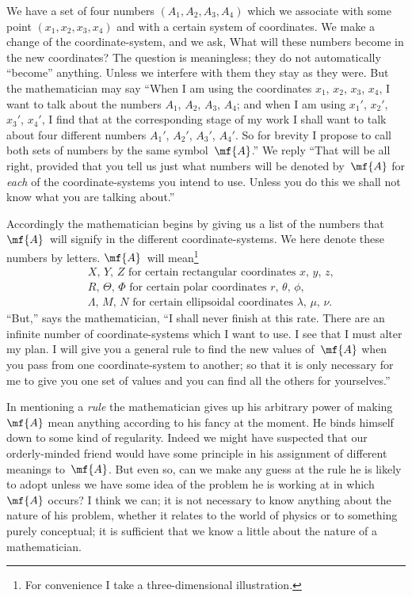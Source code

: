 \documentclass[12pt]{book}
\begin{document}
We have a set of four numbers $(A_{1}, A_{2}, A_{3}, A_{4})$ which we associate with
some point $(x_{1}, x_{2}, x_{3}, x_{4})$ and with a certain system of coordinates. We make
a change of the coordinate-system, and we ask, What will these numbers
become in the new coordinates? The question is meaningless; they do not
automatically ``become'' anything. Unless we interfere with them they stay
as they were. But the mathematician may say ``When I am using the
coordinates $x_{1}$, $x_{2}$, $x_{3}$, $x_{4}$, I want to talk about the numbers $A_{1}$, $A_{2}$, $A_{3}$, $A_{4}$;
and when I am using $x_{1}'$, $x_{2}'$, $x_{3}'$, $x_{4}'$, I find that at the corresponding stage of
my work I shall want to talk about four different numbers $A_{1}'$, $A_{2}'$, $A_{3}'$, $A_{4}'$.
So for brevity I propose to call both sets of numbers by the same symbol~$\mf{A}$.''
We reply ``That will be all right, provided that you tell us just what numbers
will be denoted by~$\mf{A}$ for \emph{each} of the coordinate-systems you intend to use.
Unless you do this we shall not know what you are talking about.''

Accordingly the mathematician begins by giving us a list of the numbers
that $\mf{A}$~will signify in the different coordinate-systems. We here denote these
numbers by letters. $\mf{A}$~will mean\footnote
  {For convenience I take a three-dimensional illustration.}
\begin{align*}
&\text{$X$, $Y$, $Z$ for certain rectangular coordinates $x$, $y$, $z$,} \\
&\text{$R$, $\Theta$, $\Phi$ for certain polar coordinates $r$, $\theta$, $\phi$,} \\
  &\text{$\Lambda$, $M$, $N$ for certain ellipsoidal coordinates $\lambda$, $\mu$, $\nu$.}
  \end{align*}
``But,'' says the mathematician, ``I shall never finish at this rate. There are
an infinite number of coordinate-systems which I want to use. I see that
I must alter my plan. I will give you a general rule to find the new values
of~$\mf{A}$ when you pass from one coordinate-system to another; so that it is only
necessary for me to give you one set of values and you can find all the others
for yourselves.''

In mentioning a \emph{rule} the mathematician gives up his arbitrary power of
making~$\mf{A}$ mean anything according to his fancy at the moment. He binds
himself down to some kind of regularity. Indeed we might have suspected
that our orderly-minded friend would have some principle in his assignment
of different meanings to~$\mf{A}$. But even so, can we make any guess at the rule
he is likely to adopt unless we have some idea of the problem he is working
at in which~$\mf{A}$ occurs? I think we can; it is not necessary to know anything
about the nature of his problem, whether it relates to the world of physics or
to something purely conceptual; it is sufficient that we know a little about
the nature of a mathematician.
\end{document}
